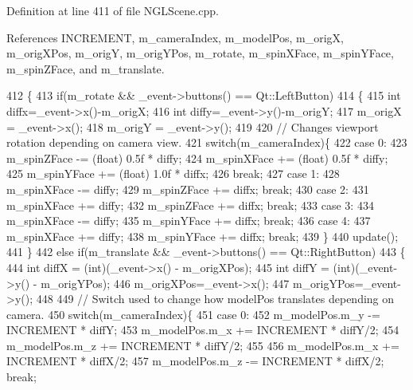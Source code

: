 Definition at line 411 of file N\-G\-L\-Scene.\-cpp.



References I\-N\-C\-R\-E\-M\-E\-N\-T, m\-\_\-camera\-Index, m\-\_\-model\-Pos, m\-\_\-orig\-X, m\-\_\-orig\-X\-Pos, m\-\_\-orig\-Y, m\-\_\-orig\-Y\-Pos, m\-\_\-rotate, m\-\_\-spin\-X\-Face, m\-\_\-spin\-Y\-Face, m\-\_\-spin\-Z\-Face, and m\-\_\-translate.


\begin{DoxyCode}
412 \{
413   \textcolor{keywordflow}{if}(m_rotate && \_event->buttons() == Qt::LeftButton)
414   \{
415     \textcolor{keywordtype}{int} diffx=\_event->x()-m_origX;
416     \textcolor{keywordtype}{int} diffy=\_event->y()-m_origY;
417     m_origX = \_event->x();
418     m_origY = \_event->y();
419 
420     \textcolor{comment}{// Changes viewport rotation depending on camera view.}
421     \textcolor{keywordflow}{switch}(m_cameraIndex)\{
422       \textcolor{keywordflow}{case} 0:
423         m_spinZFace -= (float) 0.5f * diffy;
424         m_spinXFace += (float) 0.5f * diffy;
425         m_spinYFace += (float) 1.0f * diffx;
426         \textcolor{keywordflow}{break};
427       \textcolor{keywordflow}{case} 1:
428         m_spinXFace -= diffy;
429         m_spinZFace += diffx; \textcolor{keywordflow}{break};
430       \textcolor{keywordflow}{case} 2:
431         m_spinXFace += diffy;
432         m_spinZFace += diffx; \textcolor{keywordflow}{break};
433       \textcolor{keywordflow}{case} 3:
434         m_spinXFace -= diffy;
435         m_spinYFace += diffx; \textcolor{keywordflow}{break};
436       \textcolor{keywordflow}{case} 4:
437         m_spinXFace += diffy;
438         m_spinYFace += diffx; \textcolor{keywordflow}{break};
439     \}
440     update();
441   \}
442   \textcolor{keywordflow}{else} \textcolor{keywordflow}{if}(m_translate && \_event->buttons() == Qt::RightButton)
443   \{
444     \textcolor{keywordtype}{int} diffX = (int)(\_event->x() - m_origXPos);
445     \textcolor{keywordtype}{int} diffY = (int)(\_event->y() - m_origYPos);
446     m_origXPos=\_event->x();
447     m_origYPos=\_event->y();
448 
449     \textcolor{comment}{// Switch used to change how modelPos translates depending on camera.}
450     \textcolor{keywordflow}{switch}(m_cameraIndex)\{
451     \textcolor{keywordflow}{case} 0:
452         m_modelPos.m\_y -= INCREMENT * diffY;
453         m_modelPos.m\_x += INCREMENT * diffY/2;
454         m_modelPos.m\_z += INCREMENT * diffY/2;
455 
456         m_modelPos.m\_x += INCREMENT * diffX/2;
457         m_modelPos.m\_z -= INCREMENT * diffX/2; \textcolor{keywordflow}{break};

\end{DoxyCode}
